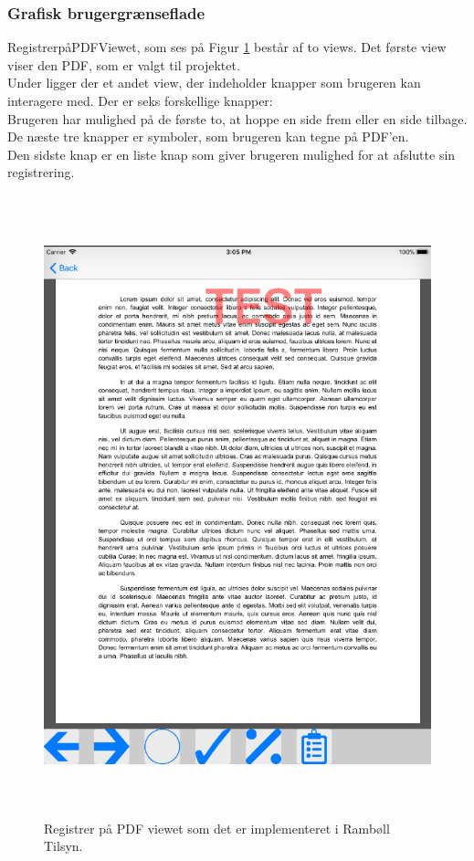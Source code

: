 \subsubsection{Grafisk brugergrænseflade}
RegistrerpåPDFViewet, som ses på Figur \ref{fig:RegistrerObjekterView} består af to views. Det første view viser den PDF, som er valgt til projektet. \\
Under ligger der et andet view, der indeholder knapper som brugeren kan interagere med. Der er seks forskellige knapper: \\
Brugeren har mulighed på de første to, at hoppe en side frem eller en side tilbage. \\
De næste tre knapper er symboler, som brugeren kan tegne på PDF'en. \\
Den sidste knap er en liste knap som giver brugeren mulighed for at afslutte sin registrering.
\begin{figure}[H] %
	\centering
	\includegraphics[height=18cm, width=15cm]{../ArkitekturDesign/Design/RegisterPDF/PDF}
	\caption{Registrer på PDF viewet som det er implementeret i Rambøll Tilsyn.}
	\label{fig:RegistrerObjekterView}
\end{figure}

